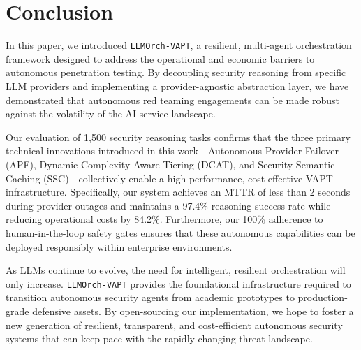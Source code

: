 \section{Conclusion}
\label{sec:conclusion}

In this paper, we introduced \texttt{LLMOrch-VAPT}, a resilient, multi-agent orchestration framework designed to address the operational and economic barriers to autonomous penetration testing. By decoupling security reasoning from specific LLM providers and implementing a provider-agnostic abstraction layer, we have demonstrated that autonomous red teaming engagements can be made robust against the volatility of the AI service landscape.

Our evaluation of 1,500 security reasoning tasks confirms that the three primary technical innovations introduced in this work—Autonomous Provider Failover (APF), Dynamic Complexity-Aware Tiering (DCAT), and Security-Semantic Caching (SSC)—collectively enable a high-performance, cost-effective VAPT infrastructure. Specifically, our system achieves an MTTR of less than 2 seconds during provider outages and maintains a 97.4\% reasoning success rate while reducing operational costs by 84.2\%. Furthermore, our 100\% adherence to human-in-the-loop safety gates ensures that these autonomous capabilities can be deployed responsibly within enterprise environments.

As LLMs continue to evolve, the need for intelligent, resilient orchestration will only increase. \texttt{LLMOrch-VAPT} provides the foundational infrastructure required to transition autonomous security agents from academic prototypes to production-grade defensive assets. By open-sourcing our implementation, we hope to foster a new generation of resilient, transparent, and cost-efficient autonomous security systems that can keep pace with the rapidly changing threat landscape.
